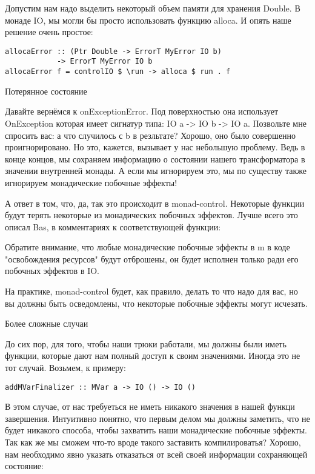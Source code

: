 Допустим нам надо выделить некоторый объем памяти для хранения Double. В монаде IO, мы могли бы просто использовать функцию alloca. И опять наше решение очень простое:

\begin{lstlisting}
allocaError :: (Ptr Double -> ErrorT MyError IO b)
            -> ErrorT MyError IO b
allocaError f = controlIO $ \run -> alloca $ run . f
\end{lstlisting}

Потерянное состояние

Давайте вернёмся к onExceptionError. Под поверхностью она использует OnException которая имеет сигнатур типа: IO a -> IO b -> IO a. Позвольте мне спросить вас: а что случилось с b в резльтате? Хорошо, оно было совершенно проигнорировано. Но это, кажется, вызывает у нас небольшую проблему. Ведь в конце концов, мы сохраняем информацию о состоянии нашего трансформатора в значении внутренней монады. А если мы игнорируем это, мы по существу также игнорируем монадические побочные эффекты!

А ответ в том, что, да, так это происходит в monad-control. Некоторые функции будут терять некоторые из монадических побочных эффектов. Лучше всего это описал Bas, в комментариях к соответствующей функции:

Обратите внимание, что любые монадические побочные эффекты в m в коде "освобождения ресурсов" будут отброшены, он будет исполнен только ради его побочных эффектов в IO.

На практике, monad-control будет, как правило, делать то что надо для вас, но вы должны быть осведомлены, что некоторые побочные эффекты могут исчезать.

Более сложные случаи

До сих пор, для того, чтобы наши трюки работали, мы должны были иметь функции, которые дают нам полный доступ к своим значениями. Иногда это не тот случай. Возьмем, к примеру:

\begin{lstlisting}
addMVarFinalizer :: MVar a -> IO () -> IO ()
\end{lstlisting}

В этом случае, от нас требуеться не иметь никакого значения в нашей функци завершения. Интуитивно понятно, что первым делом мы должны заметить, что не будет никакого способа, чтобы захватить наши монадические побочные эффекты. Так как же мы сможем что-то вроде такого заставить компилироватья? Хорошо, нам необходимо явно указать отказаться от всей своей информации сохраняющей состояние:

